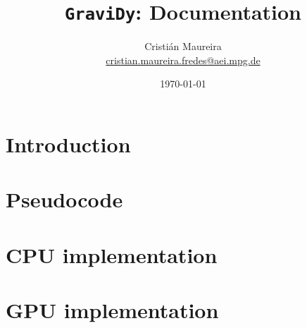 \documentclass[letter, 10pt]{article}
\begin{document}
\title{\texttt{GraviDy}: Documentation}
\author{
Cristián Maureira\\
\url{cristian.maureira.fredes@aei.mpg.de}}
\date{\today}

\maketitle

\section{Introduction}
\label{introduction}


\section{Pseudocode}
\label{pseudocode}


\section{CPU implementation}
\label{cpu}


\section{GPU implementation}
\label{gpu}


%
%
\end{document}
